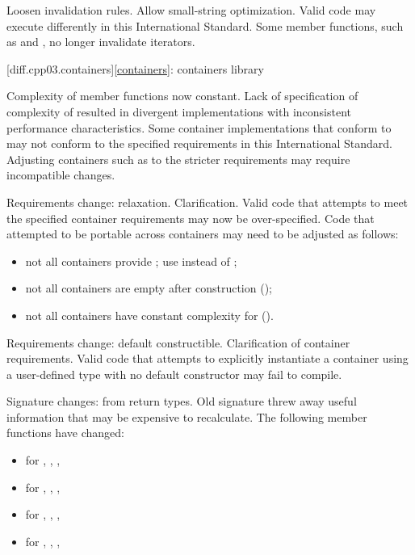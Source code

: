 \change
Loosen  invalidation rules.
\rationale
Allow small-string optimization.
\effect
Valid \CppIII{} code may execute differently in this International Standard.
Some  member functions, such as  and ,
no longer invalidate iterators.

[diff.cpp03.containers]{\ref{containers}: containers library}

\change
Complexity of  member functions now constant.
\rationale
Lack of specification of complexity of  resulted in
divergent implementations with inconsistent performance characteristics.
\effect
Some container implementations that conform to \CppIII{} may not conform to the
specified  requirements in this International Standard. Adjusting
containers such as  to the stricter requirements may require
incompatible changes.

\change
Requirements change: relaxation.
\rationale
Clarification.
\effect
Valid \CppIII{} code that attempts to meet the specified container requirements
may now be over-specified. Code that attempted to be portable across containers
may need to be adjusted as follows:
\begin{itemize}
\item not all containers provide ; use  instead
of ;
\item not all containers are empty after construction ();
\item not all containers have constant complexity for  ().
\end{itemize}

\change
Requirements change: default constructible.
\rationale
Clarification of container requirements.
\effect
Valid \CppIII{} code that attempts to explicitly instantiate a container using
a user-defined type with no default constructor may fail to compile.

\change
Signature changes: from  return types.
\rationale
Old signature threw away useful information that may be expensive
to recalculate.
\effect
The following member functions have changed:
\begin{itemize}
\item {} for , , , 
\item {} for , , , 
\item {} for , , , 
\item {} for , , , 
\end{itemize}

